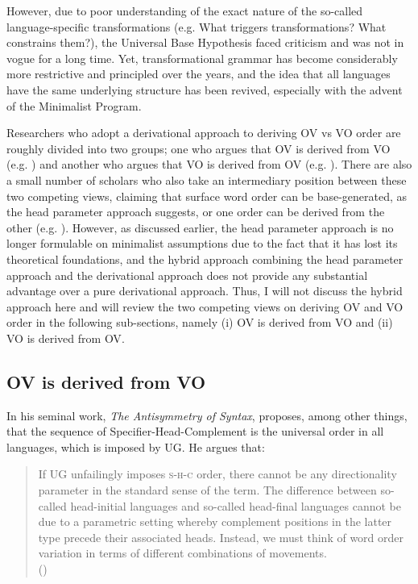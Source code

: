 \largerpage%
However, due to poor understanding of the exact nature of the so-called lan\-guage-specific transformations (e.g. What triggers transformations? What constrains them?), the Universal Base Hypothesis faced criticism and was not in vogue for a long time. Yet, transformational grammar has become considerably more restrictive and principled over the years, and the idea that all languages have the same underlying structure has been revived, especially with the advent of the Minimalist Program.

Researchers who adopt a derivational approach to deriving \ac{OV} vs \ac{VO} order are roughly divided into two groups; one who argues that \ac{OV} is derived from \ac{VO} (e.g. \citealt{Kayne1994}) and another who argues that \ac{VO} is derived from \ac{OV} (e.g. \citealt{Haider1992}). There are also a small number of scholars who also take an intermediary position between these two competing views, claiming that surface word order can be base-generated, as the head parameter approach suggests, or one order can be derived from the other (e.g. \citealt{Vicente2004}). However, as discussed earlier, the head parameter approach is no longer formulable on minimalist assumptions due to the fact that it has lost its theoretical foundations, and the hybrid approach combining the head parameter approach and the derivational approach does not provide any substantial advantage over a pure derivational approach. Thus, I will not discuss the hybrid approach here and will review the two competing views on deriving \ac{OV} and \ac{VO} order in the following sub-sections, namely (i) \ac{OV} is derived from \ac{VO} and (ii) \ac{VO} is derived from \ac{OV}.   

\subsection{OV is derived from VO}\label{ch3:sect:3.2.1}
\largerpage%
In his seminal work, \textit{The Antisymmetry of Syntax}, \citet{Kayne1994} proposes, among other things, that the sequence of Specifier-Head-Complement is the universal order in all languages, which is imposed by \ac{UG}. He argues that: 

\begin{quote}
    If \ac{UG} unfailingly imposes \textsc{s-h-c} order, there cannot be any directionality parameter in the standard sense of the term. The difference between so-called head-initial languages and so-called head-final languages cannot be due to a parametric setting whereby complement positions in the latter type precede their associated heads. Instead, we must think of word order variation in terms of different combinations of movements. \\
    \hspace*{\fill} (\citealt[47]{Kayne1994})
\end{quote}


